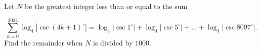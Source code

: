 Let $N$ be the greatest integer less than or equal to the sum

\[
\sum_{k=0}^{2024} \log_4 |\csc (4k+1)^{\circ}| = \log_4 |\csc 1^{\circ}| + \log_4 |\csc 5^{\circ}| + \ldots + \log_4 |\csc 8097^{\circ}|.
\]Find the remainder when $N$ is divided by $1000$.

